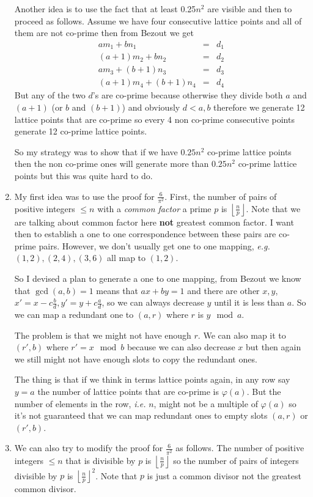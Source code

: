 \documentclass[aps,preprint,preprintnumbers,nofootinbib,showpacs,prd]{revtex4-1}
\newcommand{\ie}{{\it i.e.} }
\newcommand{\eg}{{\it e.g.} }
\newcommand{\nbea}{\begin{eqnarray*}}
\newcommand{\neea}{\end{eqnarray*}}
\begin{document}
\begin{enumerate}
Another idea is to use the fact that at least 0.25$n^2$ are visible and then to proceed as follows. Assume we have four consecutive lattice points and all of them are not co-prime then from Bezout we get
%
\nbea
am_1 + bn_1 & = & d_1 \\
(a + 1)m_2 + bn_2 & = & d_2 \\
am_3 + (b + 1)n_3 & = & d_3 \\
(a + 1)m_4 + (b + 1)n_4 & = & d_4
\neea
%
But any of the two $d$'s are co-prime because otherwise they divide both $a$ and $(a + 1)$ (or $b$ and $(b + 1)$) and obviously $d < a,b$ therefore we generate 12 lattice points that are co-prime so every 4 non co-prime consecutive points generate 12 co-prime lattice points.

So my strategy was to show that if we have $0.25 n^2$ co-prime lattice points then the non co-prime ones will generate more than $0.25 n^2$ co-prime lattice points but this was quite hard to do.

%
\item My first idea was to use the proof for $\frac{6}{\pi^2}$. First, the number of pairs of positive integers $\le n$ with a {\it common factor} a prime $p$ is $\left \lfloor \frac{n}{p} \right \rfloor$. Note that we are talking about common factor here {\bf not} greatest common factor. I want then to establish a one to one correspondence between these pairs are co-prime pairs. However, we don't usually get one to one mapping, \eg $(1,2), (2,4), (3,6)$ all map to $(1,2)$. 

So I devised a plan to generate a one to one mapping, from Bezout we know that $\gcd(a,b) = 1$ means that $ax + by = 1$ and there are other $x,y$, $x' = x - c \frac{b}{d}, y' = y + c\frac{a}{d}$, so we can always decrease $y$ until it is less than $a$. So we can map a redundant one to $(a,r)$ where $r$ is $y \mod a$.

The problem is that we might not have enough $r$. We can also map it to $(r', b)$ where $r' = x \mod b$ because we can also decrease $x$ but then again we still might not have enough slots to copy the redundant ones.

The thing is that if we think in terms lattice points again, in any row say $y=a$ the number of lattice points that are co-prime is $\varphi(a)$. But the number of elements in the row, \ie $n$, might not be a multiple of $\varphi(a)$ so it's not guaranteed that we can map redundant ones to empty slots $(a,r)$ or $(r', b)$.
%
\item We can also try to modify the proof for $\frac{6}{\pi^2}$ as follows. The number of positive integers $\le n$ that is divisible by $p$ is $\left \lfloor \frac{n}{p}\right \rfloor$ so the number of pairs of integers divisible by $p$ is  $\left \lfloor \frac{n}{p}\right \rfloor^2$. Note that $p$ is just a common divisor not the greatest common divisor.


\end{enumerate}
\end{document}
